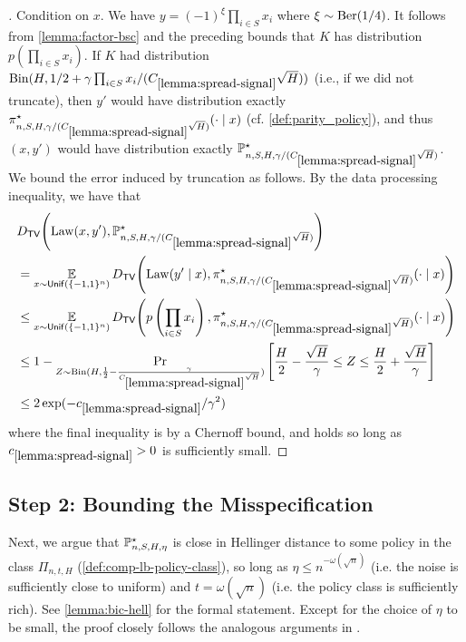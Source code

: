 \begin{proof}[]
Condition on $x$. We have $y = (-1)^\xi \prod_{i \in S} x_i$ where $\xi \sim \mathrm{Ber}(1/4)$. It follows from \cref{lemma:factor-bsc} and the preceding bounds that $K$ has distribution $p(\prod_{i \in S} x_i)$. If $K$ had distribution $\operatorname{Bin}(H, 1/2+\gamma\prod_{i \in S} x_i/(C_{\ref{lemma:spread-signal}}\sqrt{H}))$ (i.e., if we did not truncate), then $y'$ would have distribution exactly $\pi^\star_{n,S,H,\gamma/(C_{\ref{lemma:spread-signal}}\sqrt{H})}(\cdot\mid{}x)$ (cf. \cref{def:parity_policy}), and thus $(x,y')$ would have distribution exactly $\mathbb{P}^\star_{n,S,H,\gamma/(C_{\ref{lemma:spread-signal}}\sqrt{H})}$. We bound the error induced by truncation as follows. By the data processing inequality, we have that
\begin{align}
&\Dtv{\Law(x,y')}{\BP^\st_{n,S,H,\gamma/(C_{\ref{lemma:spread-signal}}\sqrt{H})}} \\
&= \EE_{x\sim \Unif(\{-1,1\}^n)} \Dtv{\Law(y'\mid{}x)}{\pi^\st_{n,S,H,\gamma/(C_{\ref{lemma:spread-signal}}\sqrt{H})}(\cdot\mid{}x)} \\ 
&\leq \EE_{x\sim \Unif(\{-1,1\}^n)} \Dtv{p\left(\prod_{i \in S} x_i\right)}{\pi^\st_{n,S,H,\gamma/(C_{\ref{lemma:spread-signal}}\sqrt{H})}(\cdot\mid{}x)} \\ 
&\leq 1 - \Prr_{Z \sim \Bin(H, \frac{1}{2}-\frac{\gamma}{C_{\ref{lemma:spread-signal}}\sqrt{H}})}\left[\frac{H}{2} - \frac{\sqrt{H}}{\gamma} \leq Z \leq \frac{H}{2} + \frac{\sqrt{H}}{\gamma}\right] \\ 
&\leq 2\exp(-c_{\ref{lemma:spread-signal}}/\gamma^2)
\end{align}
where the final inequality is by a Chernoff bound, and holds so long as $c_{\ref{lemma:spread-signal}}>0$ is sufficiently small.
\end{proof}

\subsection{Step 2: Bounding the Misspecification}\label{subsec:bounding-misspec}

Next, we argue that $\mathbb{P}^\star_{n,S,H,\eta}$ is close in Hellinger distance to some policy in the class $\Pi_{n,t,H}$ (\cref{def:comp-lb-policy-class}), so long as $\eta \leq n^{-\omega(\sqrt{n})}$ (i.e. the noise is sufficiently close to uniform) and $t = \omega(\sqrt{n})$ (i.e. the policy class is sufficiently rich). See \cref{lemma:bic-hell} for the formal statement. Except for the 
choice of $\eta$ to be small, the proof closely follows the analogous arguments in \cite{diakonikolas2022hardness}. %

